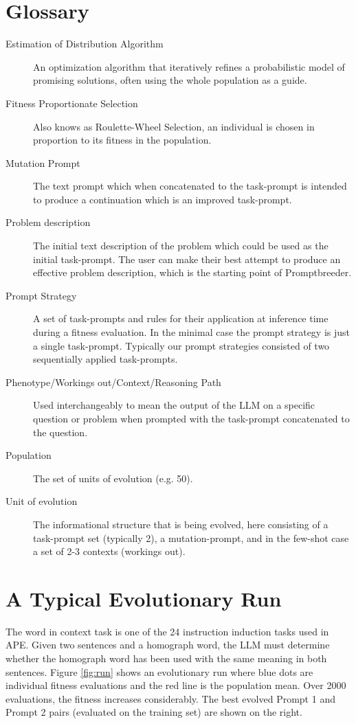 \documentclass{article} %
\begin{document}
\section{Glossary}
\label{appendix:glossary}
\begin{description}
    \item[Estimation of Distribution Algorithm] An optimization algorithm that iteratively refines a probabilistic model of promising solutions, often using the whole population as a guide.
    \item[Fitness Proportionate Selection] Also knows as Roulette-Wheel Selection, an individual is chosen in proportion to its fitness in the population. 
    \item[Mutation Prompt] The text prompt which when concatenated to the task-prompt is intended to produce a continuation which is an improved task-prompt. 
    \item[Problem description] The initial text description of the problem which could be used as the initial task-prompt. The user can make their best attempt to produce an effective problem description, which is the starting point of Promptbreeder. 
    \item[Prompt Strategy] A set of task-prompts and rules for their application at inference time during a fitness evaluation. In the minimal case the prompt strategy is just a single task-prompt. Typically our prompt strategies consisted of two sequentially applied task-prompts. 
    \item[Phenotype/Workings out/Context/Reasoning Path] Used interchangeably to mean the output of the LLM on a specific question or problem when prompted with the task-prompt concatenated to the question. 
    \item[Population] The set of units of evolution (e.g. 50). 
    \item[Unit of evolution] The informational structure that is being evolved, here consisting of a task-prompt set (typically 2), a mutation-prompt, and in the few-shot case a set of 2-3 contexts (workings out). 

\end{description}


\section{A Typical Evolutionary Run}
\label{appendix:run}
The word in context task is one of the 24 instruction induction tasks used in APE. Given two sentences and a homograph word, the LLM must determine whether the homograph word has been used with the same meaning in both sentences. Figure \ref{fig:run} shows an evolutionary run where blue dots are individual fitness evaluations and the red line is the population mean. Over 2000 evaluations, the fitness increases considerably. The best evolved Prompt 1 and Prompt 2 pairs (evaluated on the training set) are shown on the right. 
\end{document}
